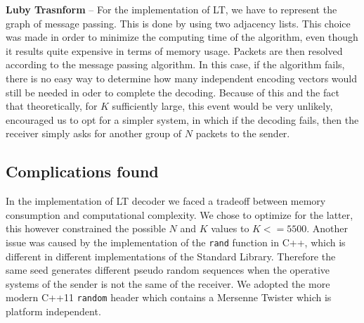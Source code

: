 \textbf{Luby Trasnform} -- For the implementation of LT, we have to represent the graph of message passing. This is done by using two adjacency lists. This choice was made in order to minimize the computing time of the algorithm, even though it results quite expensive in terms of memory usage. Packets are then resolved according to the message passing algorithm. In this case, if the algorithm fails, there is no easy way to determine how many independent encoding vectors would still be needed in oder to complete the decoding. Because of this and the fact that theoretically, for $K$ sufficiently large, this event would be very unlikely, encouraged us to opt for a simpler system, in which if the decoding fails, then the receiver simply asks for another group of $N$ packets to the sender. 

\subsection{Complications found}
In the implementation of LT decoder we faced a tradeoff between memory consumption and computational complexity. We chose to optimize for the latter, this however constrained the possible $N$ and $K$ values to $K <= 5500$. Another issue was caused by the implementation of the \texttt{rand} function in C++, which is different in different implementations of the Standard Library. Therefore the same seed generates different pseudo random sequences when the operative systems of the sender is not the same of the receiver. We adopted the more modern C++11 \texttt{random} header which contains a Mersenne Twister which is platform independent.


